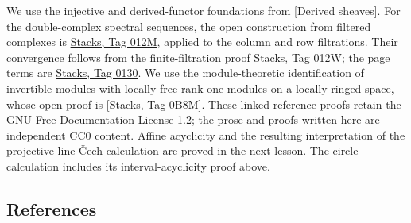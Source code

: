 \documentclass[11pt]{article}
\begin{document}
We use the injective and derived-functor foundations from {[}Derived
sheaves{]}. For the double-complex spectral sequences, the open
construction from filtered complexes is
\href{https://kokunoyumeto.github.io/stacks-zh-hans-cn/en/homology.html\#homology-lemma-spectral-sequence-filtered-complex}{Stacks,
Tag 012M}, applied to the column and row filtrations. Their convergence
follows from the finite-filtration proof
\href{https://kokunoyumeto.github.io/stacks-zh-hans-cn/en/homology.html\#homology-lemma-biregular-ss-converges}{Stacks,
Tag 012W}; the page terms are
\href{https://kokunoyumeto.github.io/stacks-zh-hans-cn/en/homology.html\#homology-lemma-ss-double-complex}{Stacks,
Tag 0130}. We use the module-theoretic identification of invertible
modules with locally free rank-one modules on a locally ringed space,
whose open proof is {[}Stacks, Tag 0B8M{]}. These linked reference
proofs retain the GNU Free Documentation License 1.2; the prose and
proofs written here are independent CC0 content. Affine acyclicity and
the resulting interpretation of the projective-line Čech calculation are
proved in the next lesson. The circle calculation includes its
interval-acyclicity proof above.

\subsection{References}\label{references}
\end{document}
